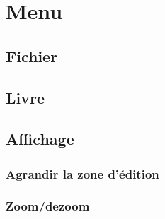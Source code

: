 \chapter{Menu}

	\section{Fichier}

	\section{Livre}

	\section{Affichage}

		\subsection{Agrandir la zone d'édition}

		\subsection{Zoom/dezoom}
